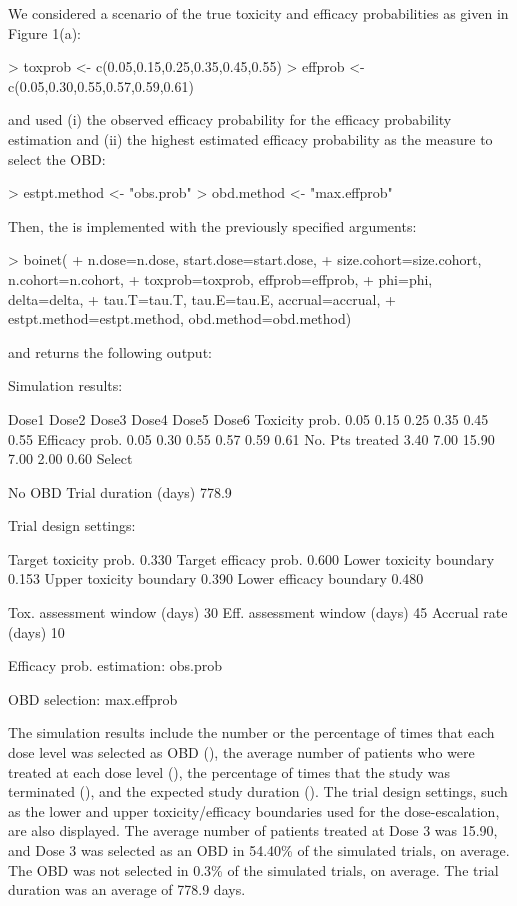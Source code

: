 We considered a scenario of the true toxicity and efficacy probabilities as given in Figure 1(a):
\begin{example}
> toxprob <- c(0.05,0.15,0.25,0.35,0.45,0.55)
> effprob <- c(0.05,0.30,0.55,0.57,0.59,0.61)
\end{example}
and used (i) the observed efficacy probability for the efficacy probability estimation and (ii) the highest estimated efficacy probability as the measure to select the OBD:
\begin{example}
> estpt.method <- "obs.prob"
> obd.method   <- "max.effprob"
\end{example}
Then, the  is implemented with the previously specified arguments:
\begin{example}
> boinet(
+   n.dose=n.dose, start.dose=start.dose,
+   size.cohort=size.cohort, n.cohort=n.cohort,
+   toxprob=toxprob, effprob=effprob,
+   phi=phi, delta=delta,
+   tau.T=tau.T, tau.E=tau.E, accrual=accrual,
+   estpt.method=estpt.method, obd.method=obd.method)
\end{example}
and returns the following output:
\begin{example}
Simulation results:

                 Dose1  Dose2  Dose3  Dose4  Dose5  Dose6
Toxicity prob.    0.05   0.15   0.25   0.35   0.45   0.55
Efficacy prob.    0.05   0.30   0.55   0.57   0.59   0.61
No. Pts treated   3.40   7.00  15.90   7.00   2.00   0.60
Select %

No OBD %
Trial duration (days)  778.9

Trial design settings:

Target toxicity prob.    0.330
Target efficacy prob.    0.600
Lower toxicity boundary  0.153
Upper toxicity boundary  0.390
Lower efficacy boundary  0.480

Tox. assessment window (days)  30
Eff. assessment window (days)  45
Accrual rate (days)            10

Efficacy prob. estimation: obs.prob

OBD selection: max.effprob
\end{example}
The simulation results include the number or the percentage of times that each dose level was selected as OBD (), the average number of patients who were treated at each dose level (), the percentage of times that the study was terminated (), and the expected study duration (). The trial design settings, such as the lower and upper toxicity/efficacy boundaries used for the dose-escalation, are also displayed. The average number of patients treated at Dose 3 was 15.90, and Dose 3 was selected as an OBD in 54.40\% of the simulated trials, on average. The OBD was not selected in 0.3\% of the simulated trials, on average. The trial duration was an average of 778.9 days.

